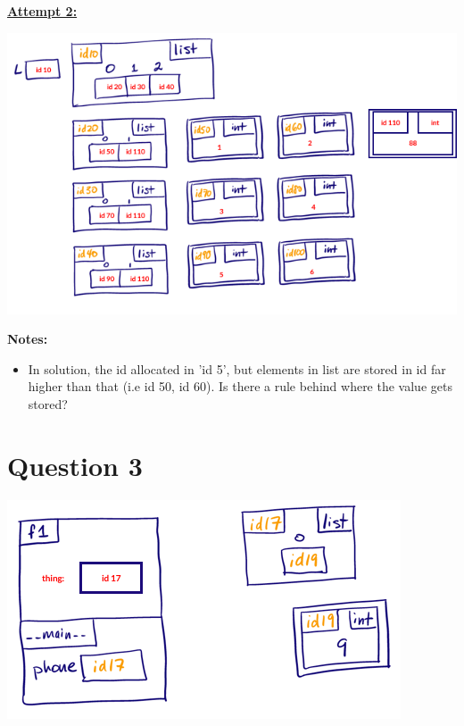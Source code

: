 \documentclass[12pt]{article}
\begin{document}
\bigskip

\begin{mdframed}
    \underline{\textbf{Attempt 2:}}

    \bigskip

    \begin{center}
    \includegraphics[width=0.8\linewidth]{images/worksheet_1_q2_correction.png}
    \end{center}

\end{mdframed}

\bigskip

\textbf{Notes:}

\begin{itemize}
    \item In solution, the id allocated in 'id 5', but elements in list are stored
    in id far higher than that (i.e id 50, id 60). Is there a rule behind where
    the value gets stored?
\end{itemize}

\section*{Question 3}
\begin{center}
\includegraphics[width=0.5\linewidth]{images/worksheet_1_q3_solution.png}
\end{center}

\bigskip
\end{document}

